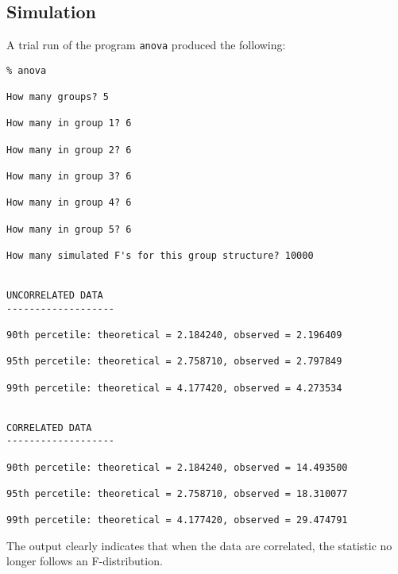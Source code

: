 \documentclass{article}
\begin{document}
\subsection{Simulation}
\label{sec:sim}
A trial run of the program {\tt anova} produced the following:
\begin{verbatim}
% anova
 
How many groups? 5
 
How many in group 1? 6
 
How many in group 2? 6
 
How many in group 3? 6
 
How many in group 4? 6
 
How many in group 5? 6
 
How many simulated F's for this group structure? 10000
 
 
UNCORRELATED DATA
-------------------
 
90th percetile: theoretical = 2.184240, observed = 2.196409
 
95th percetile: theoretical = 2.758710, observed = 2.797849
 
99th percetile: theoretical = 4.177420, observed = 4.273534
 
 
CORRELATED DATA
-------------------
 
90th percetile: theoretical = 2.184240, observed = 14.493500
 
95th percetile: theoretical = 2.758710, observed = 18.310077
 
99th percetile: theoretical = 4.177420, observed = 29.474791
\end{verbatim}
The output clearly indicates that when the data are correlated, the
statistic no longer follows an F-distribution.
\end{document}
